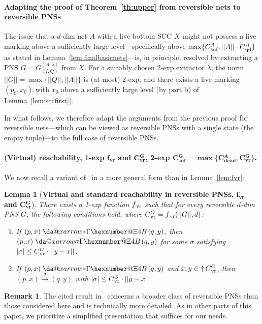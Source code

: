 \documentclass[11pt,a4paper]{amsart}
\makeatletter
\newcommand{\step}[1]{\mathrel{\xrightarrow{#1}}}
\newcommand{\virtual}[1]{\mathrel{\xdashrightarrow{#1}}\hspace{-0.3em}}
\newcommand{\vreach}{\virtual{*}}
\newcommand{\nnorm}[1]{||#1||}
\newcommand{\vr}{{}_\textnormal{vr}}
\newcommand{\bvr}{{}_\textbf{vr}}
\newcommand{\upC}[1]{\mathop{\uparrow}#1}
\newcommand{\bdead}{{}_\textbf{dead}}
\newcommand{\suf}{{}_\textnormal{suf}}
\newcommand{\bsuf}{{}_\textbf{suf}}
\newcommand{\qd}{{}_\textnormal{qd}}
\newcommand*{\da@rightarrow}{\mathchar"0\hexnumber@\symAMSa 4B }
\newcommand*{\xdashrightarrow}[2][]{%
  \mathrel{%
    \mathpalette{\da@xarrow{#1}{#2}{}\da@rightarrow{\,}{}}{}%
  }%
}
\newcommand*{\da@xarrow}[7]{%
  \sbox0{$\ifx#7\scriptstyle\scriptscriptstyle\else\scriptstyle\fi#5#1#6\m@th$}%
  \sbox2{$\ifx#7\scriptstyle\scriptscriptstyle\else\scriptstyle\fi#5#2#6\m@th$}%
  \sbox4{$#7\dabar@\m@th$}%
  \dimen@=\wd0 %
  \ifdim\wd2 >\dimen@
    \dimen@=\wd2 %
  \fi
  \count@=2 %
  \def\da@bars{\dabar@\dabar@}%
  \@whiledim\count@\wd4<\dimen@\do{%
    \advance\count@\@ne
    \expandafter\def\expandafter\da@bars\expandafter{%
      \da@bars
      \dabar@ 
    }%
  }%
  \mathrel{#3}%
  \mathrel{%
    \mathop{\da@bars}\limits
    \ifx\\#1\\%
    \else
      _{\copy0}%
    \fi
    \ifx\\#2\\%
    \else
      ^{\copy2}%
    \fi
  }%
  \mathrel{#4}%
}
\theoremstyle{plain}
\newtheorem{lem}[thm]{Lemma}
\theoremstyle{definition}
\newtheorem{rem}[thm]{Remark}
\theoremstyle{defC}
\theoremstyle{thmC}
\makeatother
\begin{document}
\paragraph{Adapting the proof of Theorem~\ref{th:upper} from 
reversible nets to reversible PNSs}
The issue that a $d$-dim net $A$ with a live bottom SCC $X$ might not
possess a live marking 
above a sufficiently large level---specifically above
$\max\{C\suf^A,\nnorm{A}\cdot C\qd^A\}$ as stated in
Lemma~\ref{lem:finalbasicnets}---is, in principle,
resolved by extracting a PNS $G=G_{(I,Q)}^{(A,\lambda)}$ from $X$.
For a suitably chosen 2-exp extractor $\lambda$, the norm
$\nnorm{G}=\max\{\nnorm{Q},\nnorm{A}\}$ is (at most) 2-exp, and there
exists a live marking $(p_0,x_0)$ with $x_0$ above a sufficiently
large level (by part b) of Lemma~\ref{lem:sccfirst}).

In what follows, we therefore adapt the arguments from the previous proof
for reversible nets---which can be viewed as reversible PNSs with a
single state (the empty tuple)---to the full case of reversible PNSs.


\paragraph{(Virtual) reachability, 1-exp
$\bm{f\bvr}$ and $\bm{C\bvr^G}$, 2-exp
$\bm{C\bsuf^G=\max\{C\bdead^A,C\bvr^G\}}$.}
We now recall a variant of~\cite[Lemma~5]{DBLP:conf/fsttcs/Leroux19} in a more
general form than in Lemma~\ref{lem:fvr}:

\begin{lem}[\textbf{Virtual and standard reachability in
reversible PNSs, $\bm{f\bvr}$ and $\bm{C\bvr^G}$}]\label{lem:pnsreachfirst}
	There exists a 1-exp function $f\vr$ such that 
for every reversible $d$-dim PNS $G$, the following conditions hold,
	where	
$C\vr^G=f\vr(\nnorm{G},d)$:
	\begin{enumerate}
		\item
			If $(p,x)\vreach (q,y)$, then
			$(p,x)\virtual{\sigma}(q,y)$
for some $\sigma$ satisfying
			$|\sigma|\leq
					C\vr^G\cdot \nnorm{y-x}$.
\item
	If $(p,x)\vreach (q,y)$
			and  $x,y\in\upC{C\vr^G}$, 
			then $(p,x)\step{\sigma}(q,y)$
	with
		$|\sigma|\leq
		C\vr^G\cdot \nnorm{y-x}$.
	\end{enumerate}


\end{lem}
\begin{rem}
The cited result in~\cite{DBLP:conf/fsttcs/Leroux19} concerns
a broader class 
of reversible PNSs than those considered here and is technically more
detailed.
As in other parts of this paper, we prioritize a simplified presentation 
that suffices for our needs.
\end{rem}
\end{document}
